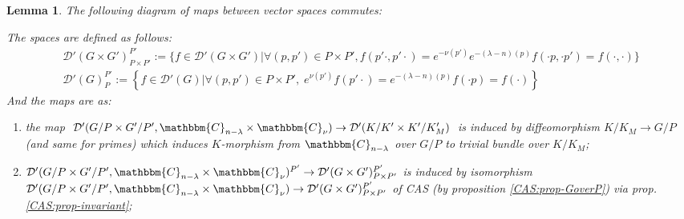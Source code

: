 \documentclass{article}
\newcommand{\assign}{:=}
\newtheorem{lemma}{Lemma}
\begin{document}
\begin{lemma}
  \label{holoop:lem-commdiag}The following diagram of maps between vector
  spaces commutes:
  
  \begin{center}
  \end{center}
  
  The spaces are defined as follows:
  \begin{eqnarray}
    & \mathcal{D}' (G \times G')_{P \times P'}^{P'} \assign \{ f \in
    \mathcal{D}' (G \times G') | \forall (p, p') \in P \times P', f (p' \cdot,
    p' \cdot) = e^{- \nu (p')} e^{- (\lambda - n) (p)} f (\cdot p, \cdot p') =
    f (\cdot, \cdot) \} &  \nonumber\\
    & \mathcal{D}' (G)_P^{P'} \assign \left\{ f \in \mathcal{D}' (G) \big|
    \forall (p, p') \in P \times P', \; e^{\nu (p')} f (p' \cdot) = e^{-
    (\lambda - n) (p)} f (\cdot p) = f (\cdot) \right\} &  \nonumber
  \end{eqnarray}
  And the maps are as:
  \begin{enumerate}
    \item the map $\mathcal{D}' (G / P \times G' / P', \mathbbm{C}_{n -
    \lambda} \times \mathbbm{C}_{\nu}) \rightarrow \mathcal{D}' (K / K' \times
    K' / K_M')$ is induced by diffeomorphism $K / K_M \rightarrow G / P$ (and
    same for primes) which induces $K$-morphism from $\mathbbm{C}_{n -
    \lambda}$ over $G / P$ to trivial bundle over $K / K_M$;
    
    \item $\mathcal{D}' (G / P \times G' / P', \mathbbm{C}_{n - \lambda}
    \times \mathbbm{C}_{\nu})^{P'} \rightarrow \mathcal{D}' (G \times
    G')^{P'}_{P \times P'}$ is induced by isomorphism $\mathcal{D}' (G / P
    \times G' / P', \mathbbm{C}_{n - \lambda} \times \mathbbm{C}_{\nu})
    \rightarrow \mathcal{D}' (G \times G')_{P \times P'}^{P'}$ of CAS (by
    proposition \ref{CAS:prop-GoverP}) via prop. \ref{CAS:prop-invariant};
    

\end{enumerate}
\end{lemma}
\end{document}
